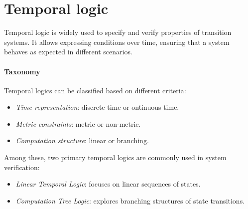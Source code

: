 \section{Temporal logic}

Temporal logic is widely used to specify and verify properties of transition systems. 
It allows expressing conditions over time, ensuring that a system behaves as expected in different scenarios.

\paragraph*{Taxonomy}
Temporal logics can be classified based on different criteria:
\begin{itemize}
    \item \textit{Time representation}: discrete-time or ontinuous-time.
    \item \textit{Metric constraints}: metric or non-metric.
    \item \textit{Computation structure}: linear or branching.
\end{itemize}
\noindent Among these, two primary temporal logics are commonly used in system verification:
\begin{itemize}
    \item \textit{Linear Temporal Logic}: focuses on linear sequences of states.
    \item \textit{Computation Tree Logic}: explores branching structures of state transitions.
\end{itemize}